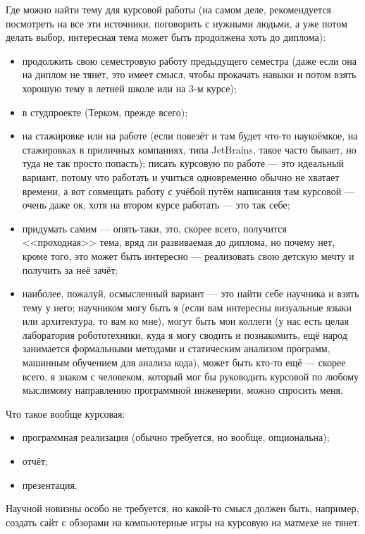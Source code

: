 \documentclass[a5paper]{article}
\begin{document}
Где можно найти тему для курсовой работы (на самом деле, рекомендуется посмотреть на все эти источники, поговорить с нужными людьми, а уже потом делать выбор, интересная тема может быть продолжена хоть до диплома):
\begin{itemize}
	\item продолжить свою семестровую работу предыдущего семестра (даже если она на диплом не тянет, это имеет смысл, чтобы прокачать навыки и потом взять хорошую тему в летней школе или на 3-м курсе);
	\item в студпроекте (Терком, прежде всего);
	\item на стажировке или на работе (если повезёт и там будет что-то наукоёмкое, на стажировках в приличных компаниях, типа JetBrains, такое часто бывает, но туда не так просто попасть); писать курсовую по работе --- это идеальный вариант, потому что работать и учиться одновременно обычно не хватает времени, а вот совмещать работу с учёбой путём написания там курсовой --- очень даже ок, хотя на втором курсе работать --- это так себе;
	\item придумать самим --- опять-таки, это, скорее всего, получится <<проходная>> тема, вряд ли развиваемая до диплома, но почему нет, кроме того, это может быть интересно --- реализовать свою детскую мечту и получить за неё зачёт;
	\item наиболее, пожалуй, осмысленный вариант --- это найти себе научника и взять тему у него; научником могу быть я (если вам интересны визуальные языки или архитектура, то вам ко мне), могут быть мои коллеги (у нас есть целая лаборатория робототехники, куда я могу сводить и познакомить, ещё народ занимается формальными методами и статическим анализом программ, машинным обучением для анализа кода), может быть кто-то ещё --- скорее всего, я знаком с человеком, который мог бы руководить курсовой по любому мыслимому направлению программной инженерии, можно спросить меня.
\end{itemize}

Что такое вообще курсовая:
\begin{itemize}
	\item программная реализация (обычно требуется, но вообще, опциональна);
	\item отчёт;
	\item презентация.
\end{itemize}

Научной новизны особо не требуется, но какой-то смысл должен быть, например, создать сайт с обзорами на компьютерные игры на курсовую на матмехе не тянет.
\end{document}
